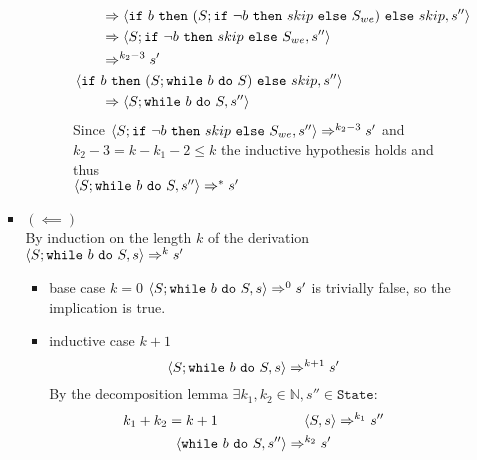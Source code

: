 \begin{exercise}
\begin{enumerate}
\begin{itemize}
\begin{itemize}
\begin{itemize}
\begin{itemize}
\begin{align*}
                                            \\&\qquad\Rightarrow \left<\texttt{if}\ b\ \texttt{then}\ (S; \texttt{if}\ \neg b\ \texttt{then}\ skip\ \texttt{else}\ S_{we})\ \texttt{else}\ skip, s''\right>
                                            \\&\qquad\Rightarrow \left<S; \texttt{if}\ \neg b\ \texttt{then}\ skip\ \texttt{else}\ S_{we}, s''\right>
                                            \\&\qquad\Rightarrow^{k_2 - 3} s'
                                            \\
                                            &\left<\texttt{if}\ b\ \texttt{then}\ (S; \texttt{while}\ b\ \texttt{do}\ S)\ \texttt{else}\ skip, s''\right>
                                            \\&\qquad\Rightarrow \left<S; \texttt{while}\ b\ \texttt{do}\ S, s''\right>
                                        \end{align*}
                                        Since $\left<S; \texttt{if}\ \neg b\ \texttt{then}\ skip\ \texttt{else}\ S_{we}, s''\right> \Rightarrow^{k_2 - 3} s'$ and $k_2 - 3 = k - k_1 - 2 \leq k$ the inductive hypothesis holds and thus \\ $\left<S; \texttt{while}\ b\ \texttt{do}\ S, s''\right> \Rightarrow^* s'$
                                    \end{itemize}
                            \end{itemize}
                        \item $(\impliedby)$ \vspace{0.2cm} \\
                            By induction on the length $k$ of the derivation $\left<S; \texttt{while}\ b\ \texttt{do}\ S, s\right> \Rightarrow^k s'$
                            \begin{itemize}
                                \item base case $k=0$
                                    $\left<S; \texttt{while}\ b\ \texttt{do}\ S, s\right> \Rightarrow^0 s'$ is trivially false, so the implication is true.
                                \item inductive case $k+1$ \vspace*{-0.3cm}
                                    \[ \left<S; \texttt{while}\ b\ \texttt{do}\ S, s\right> \Rightarrow^{k+1} s' \]
                                    By the decomposition lemma $\exists k_1, k_2 \in \mathbb{N}, s'' \in \texttt{State} :$
                                    \begin{gather*}
                                        k_1 + k_2 = k + 1 \qquad\qquad\qquad \instr{S}{s} \Rightarrow^{k_1} s'' \\
                                        \instr{\wwhile{b}{S}}{s''} \Rightarrow^{k_2} s'

\end{gather*}
\end{itemize}
\end{itemize}
\end{itemize}
\end{enumerate}
\end{exercise}
